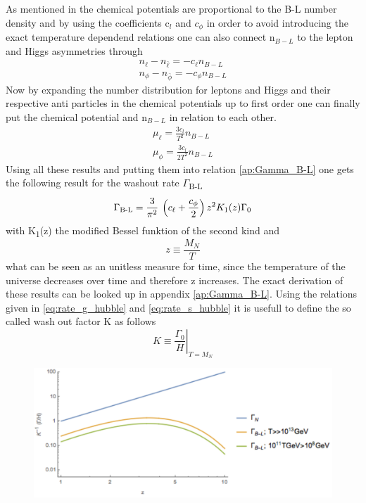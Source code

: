 As mentioned in \cite[p. 7]{Bodeker:2013qaa} the chemical potentials are proportional to the B-L number density and by using the coefficients c$_l$ and $c_\phi$ in order to avoid introducing the exact temperature dependend relations one can also connect n$_{B-L}$ to the lepton and Higgs asymmetries through \cite[p. 7]{Bodeker:2013qaa}
\begin{align}
	n_\ell-n_{\bar{\ell}}=-c_\ell n_{B-L}
	\label{eq:l-lbar} \\
	n_\phi-n_{\bar{\phi}}=-c_\phi n_{B-L}
	\label{eq:phi-phibar}
\end{align}
Now by expanding the number distribution for leptons and Higgs and their respective anti particles in the chemical potentials up to first order one can finally put the chemical potential and n$_{B-L}$ in relation to each other. 
\begin{align}
\mu_\ell=\frac{3c_l}{T^2}n_{B-L}
\label{eq:chempot_l}
\\
\mu_\phi=\frac{3c_l}{2T^2}n_{B-L}
\label{eq:chempot_phi}
\end{align}
Using all these results and putting them into relation \ref{ap:Gamma_B-L} one gets the following result for the washout rate $\Gamma$\textsubscript{B-L}
\begin{equation}
	\Gamma\textsubscript{B-L}=\frac{3}{\pi^2}\:\left(c_\ell+\frac{c_\phi}{2}\right)z^2K_1(z)\Gamma_0
	\label{eq:Gamma_B-l_result}
\end{equation}
with K\textsubscript{1}(z) the modified Bessel funktion of the second kind and 
\begin{equation}
	z\equiv\frac{M_N}{T}
\end{equation}
what can be seen as an unitless measure for time, since the temperature of the universe decreases over time and therefore z increases. 
The exact derivation of these results can be looked up in appendix \ref{ap:Gamma_B-L}. \newline
Using the relations given in \ref{eq:rate_g_hubble} and \ref{eq:rate_s_hubble} it is usefull to define the so called wash out factor K as follows
\begin{equation}
	K\equiv\left.\frac{\Gamma_0}{H}\right|_{T=M_N}
\end{equation}
\begin{figure}[H]
	\centering
	\includegraphics[width=0.7\linewidth]{Images/rates}
	\caption{}
	\label{fig:rates}
\end{figure}
